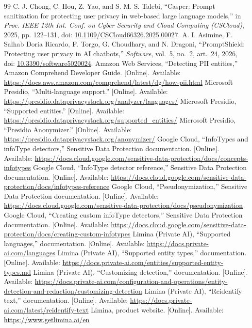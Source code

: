 \documentclass[12pt,a4paper]{article}
\newcommand{\doi}[1]{doi: \href{https://doi.org/#1}{#1}}
\begin{document}
\begin{thebibliography}{99}
 C. J. Chong, C. Hou, Z. Yao, and S. M. S. Talebi, ``Casper: Prompt sanitization for protecting user privacy in web-based large language models,'' in \emph{Proc. IEEE 12th Int. Conf. on Cyber Security and Cloud Computing (CSCloud)}, 2025, pp. 122--131, \doi{10.1109/CSCloud66326.2025.00027}.
 A. I. Asimine, F. Salhab Doria Ricardo, F. Torgo, G. Choudhary, and N. Dragoni, ``PromptShield: Protecting user privacy in AI chatbots,'' \emph{Software}, vol.~5, no.~2, art.~24, 2026, \doi{10.3390/software5020024}.
 Amazon Web Services, ``Detecting PII entities,'' Amazon Comprehend Developer Guide. [Online]. Available: \url{https://docs.aws.amazon.com/comprehend/latest/dg/how-pii.html}
 Microsoft Presidio, ``Multi-language support.'' [Online]. Available: \url{https://presidio.dataprivacystack.org/analyzer/languages/}
 Microsoft Presidio, ``Supported entities.'' [Online]. Available: \url{https://presidio.dataprivacystack.org/supported_entities/}
 Microsoft Presidio, ``Presidio Anonymizer.'' [Online]. Available: \url{https://presidio.dataprivacystack.org/anonymizer/}
 Google Cloud, ``InfoTypes and infoType detectors,'' Sensitive Data Protection documentation. [Online]. Available: \url{https://docs.cloud.google.com/sensitive-data-protection/docs/concepts-infotypes}
 Google Cloud, ``InfoType detector reference,'' Sensitive Data Protection documentation. [Online]. Available: \url{https://docs.cloud.google.com/sensitive-data-protection/docs/infotypes-reference}
 Google Cloud, ``Pseudonymization,'' Sensitive Data Protection documentation. [Online]. Available: \url{https://docs.cloud.google.com/sensitive-data-protection/docs/pseudonymization}
 Google Cloud, ``Creating custom infoType detectors,'' Sensitive Data Protection documentation. [Online]. Available: \url{https://docs.cloud.google.com/sensitive-data-protection/docs/creating-custom-infotypes}
 Limina (Private AI), ``Supported languages,'' documentation. [Online]. Available: \url{https://docs.private-ai.com/languages}
 Limina (Private AI), ``Supported entity types,'' documentation. [Online]. Available: \url{https://docs.private-ai.com/entities/supported-entity-types.md}
 Limina (Private AI), ``Customizing detection,'' documentation. [Online]. Available: \url{https://docs.private-ai.com/configuration-and-operations/entity-detection-and-redaction/customizing-detection}
 Limina (Private AI), ``Reidentify text,'' documentation. [Online]. Available: \url{https://docs.private-ai.com/latest/reidentify-text}
 Limina, product website. [Online]. Available: \url{https://www.getlimina.ai/en}
\end{thebibliography}
\end{document}
